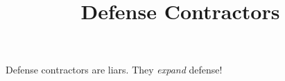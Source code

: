 \documentclass{article}
\title{Defense Contractors}
\begin{document}
Defense contractors are liars. They \textit{expand} defense!
\end{document}
